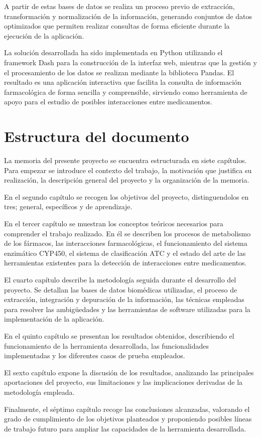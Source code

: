 A partir de estas bases de datos se realiza un proceso previo de extracción, transformación y normalización de la información, generando conjuntos de datos optimizados que permiten realizar consultas de forma eficiente durante la ejecución de la aplicación.

La solución desarrollada ha sido implementada en Python utilizando el framework Dash para la construcción de la interfaz web, mientras que la gestión y el procesamiento de los datos se realizan mediante la biblioteca Pandas. El resultado es una aplicación interactiva que facilita la consulta de información farmacológica de forma sencilla y comprensible, sirviendo como herramienta de apoyo para el estudio de posibles interacciones entre medicamentos.


\section{Estructura del documento}
La memoria del presente proyecto se encuentra estructurada en siete capítulos. Para empezar se introduce el contexto del trabajo, la motivación que justifica su realización, la descripción general del proyecto y la organización de la memoria. 

En el segundo capítulo se recogen los objetivos del proyecto, distinguendolos en tres; general, específicos y de aprendizaje. 

En el tercer capítulo se muestran los conceptos teóricos necesarios para comprender el trabajo realizado. En él se describen los procesos de metabolismo de los fármacos, las interacciones farmacológicas, el funcionamiento del sistema enzimático CYP450, el sistema de clasificación ATC y el estado del arte de las herramientas existentes para la detección de interacciones entre medicamentos. 

El cuarto capítulo describe la metodología seguida durante el desarrollo del proyecto. Se detallan las bases de datos biomédicas utilizadas, el proceso de extracción, integración y depuración de la información, las técnicas empleadas para resolver las ambigüedades y las herramientas de software utilizadas para la implementación de la aplicación.

En el quinto capítulo se presentan los resultados obtenidos, describiendo el funcionamiento de la herramienta desarrollada, las funcionalidades implementadas y los diferentes casos de prueba empleados.

El sexto capítulo expone la discusión de los resultados, analizando las principales aportaciones del proyecto, sus limitaciones y las implicaciones derivadas de la metodología empleada.

Finalmente, el séptimo capítulo recoge las conclusiones alcanzadas, valorando el grado de cumplimiento de los objetivos planteados y proponiendo posibles líneas de trabajo futuro para ampliar las capacidades de la herramienta desarrollada.
